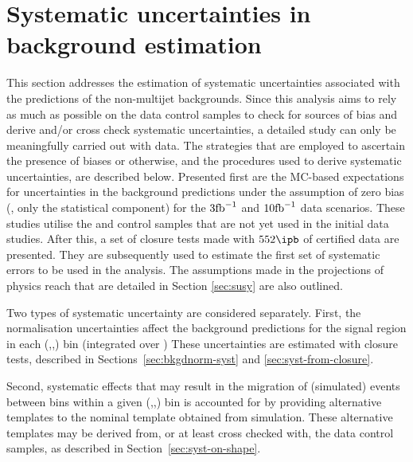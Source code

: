 \section{Systematic uncertainties in background estimation}
\label{sec:systematics}

This section addresses the estimation of systematic uncertainties
associated with the predictions of the non-multijet backgrounds. Since
this analysis aims to rely as much as possible on the data control
samples to check for sources of bias and derive and/or cross check
systematic uncertainties, a detailed study can only be meaningfully
carried out with data. The strategies that are employed to
ascertain the presence of biases or otherwise, and the procedures used
to derive systematic uncertainties, are described below. Presented
first are the MC-based
expectations for uncertainties in the background predictions under the
assumption of zero bias (\ie, only the statistical component) for the
$3\text{fb}^{-1}$ and $10\text{fb}^{-1}$ data scenarios. These studies utilise the
\ej and \eej control samples that are not yet used in the initial
data studies. After this, a set of closure tests made with $552\ipb$ of certified
data are presented. They are subsequently used to estimate the first
set of systematic errors to be used in the analysis. The assumptions made in 
the projections of physics reach
that are detailed in Section \ref{sec:susy} are also outlined.

Two types of systematic uncertainty are considered separately. First,
the normalisation uncertainties affect the background predictions for
the signal region in each (\nb,\njet,\scalht) bin (integrated over \mht)
These uncertainties are estimated with closure tests, described in
Sections~\ref{sec:bkgdnorm-syst} and \ref{sec:syst-from-closure}.

Second, systematic effects that may result in the migration of
(simulated) events between \mht bins within a given (\njet,\nb,\scalht)
bin is accounted for by providing alternative templates to the nominal
\mht template obtained from simulation. These alternative \mht
templates may be derived from, or at least cross checked with, the
data control samples, as described in Section~\ref{sec:syst-on-shape}.

